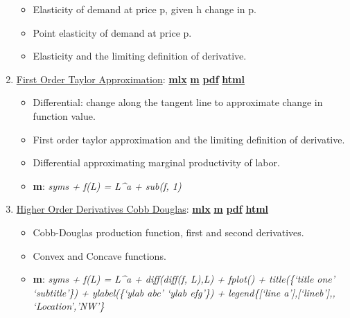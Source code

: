 \documentclass[
]{book}
\providecommand{\tightlist}{%
  \setlength{\itemsep}{0pt}\setlength{\parskip}{0pt}}
\begin{document}
\begin{enumerate}
  \begin{itemize}
  \tightlist
  \item
    Elasticity of demand at price p, given h change in p.
  \item
    Point elasticity of demand at price p.
  \item
    Elasticity and the limiting definition of derivative.
  \end{itemize}
\item
  \href{https://Math4Econ.github.io/derivative/htmlpdfm/derivative_MPL_first_order_taylor_approximation.html}{First Order Taylor Approximation}: \href{https://github.com/Math4Econ/Math4Econ.github.io/blob/main/derivative/derivative_MPL_first_order_taylor_approximation.mlx}{\textbf{mlx}} \textbar{} \href{https://github.com/Math4Econ/Math4Econ.github.io/blob/main/derivative/htmlpdfm/derivative_MPL_first_order_taylor_approximation.m}{\textbf{m}} \textbar{} \href{https://github.com/Math4Econ/Math4Econ.github.io/blob/main/derivative/htmlpdfm/derivative_MPL_first_order_taylor_approximation.pdf}{\textbf{pdf}} \textbar{} \href{https://Math4Econ.github.io/derivative/htmlpdfm/derivative_MPL_first_order_taylor_approximation.html}{\textbf{html}}

  \begin{itemize}
  \tightlist
  \item
    Differential: change along the tangent line to approximate change in function value.
  \item
    First order taylor approximation and the limiting definition of derivative.
  \item
    Differential approximating marginal productivity of labor.
  \item
    \textbf{m}: \emph{syms + f(L) = L\^{}a + sub(f, 1)}
  \end{itemize}
\item
  \href{https://Math4Econ.github.io/derivative/htmlpdfm/second_derivative.html}{Higher Order Derivatives Cobb Douglas}: \href{https://github.com/Math4Econ/Math4Econ.github.io/blob/main/derivative/second_derivative.mlx}{\textbf{mlx}} \textbar{} \href{https://github.com/Math4Econ/Math4Econ.github.io/blob/main/derivative/htmlpdfm/second_derivative.m}{\textbf{m}} \textbar{} \href{https://github.com/Math4Econ/Math4Econ.github.io/blob/main/derivative/htmlpdfm/second_derivative.pdf}{\textbf{pdf}} \textbar{} \href{https://Math4Econ.github.io/derivative/htmlpdfm/second_derivative.html}{\textbf{html}}

  \begin{itemize}
  \tightlist
  \item
    Cobb-Douglas production function, first and second derivatives.
  \item
    Convex and Concave functions.
  \item
    \textbf{m}: \emph{syms + f(L) = L\^{}a + diff(diff(f, L),L) + fplot() + title(\{`title one' `subtitle'\}) + ylabel(\{`ylab abc' `ylab efg'\}) + legend\{{[}`line a'{]},{[}`lineb'{]},, `Location','NW'\}}
  \end{itemize}
\end{enumerate}
\end{document}
